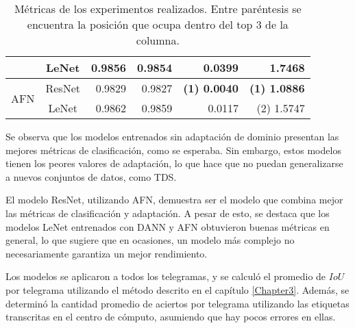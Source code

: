 \begin{table}[H]
\begin{tabular}{cc|rr|rr}
                                     & LeNet  & 0.9856                              & 0.9854                              & 0.0399                              & 1.7468                              \\\hline
        \multirow[c]{2}{*}{AFN}      & ResNet & 0.9829                              & 0.9827                              & \textbf{{\footnotesize (1)} 0.0040} & \textbf{{\footnotesize (1)} 1.0886} \\
                                     & LeNet  & 0.9862                              & 0.9859                              & 0.0117                              & {\footnotesize (2)} 1.5747          \\

        \bottomrule
    \end{tabular}
    \caption{Métricas de los experimentos realizados. Entre paréntesis se encuentra la posición que ocupa dentro del top 3 de la columna.}
    \label{tab:metricas-experimentos}
\end{table}

Se observa que los modelos entrenados sin adaptación de dominio presentan las mejores métricas de clasificación, como
se esperaba. Sin embargo, estos modelos tienen los peores valores de adaptación, lo que hace que no puedan
generalizarse a nuevos conjuntos de datos, como TDS.

El modelo ResNet, utilizando AFN, demuestra ser el modelo que combina mejor las métricas de clasificación y adaptación.
A pesar de esto, se destaca que los modelos LeNet entrenados con DANN y AFN obtuvieron buenas métricas en general, lo
que sugiere que en ocasiones, un modelo más complejo no necesariamente garantiza un mejor rendimiento.

Los modelos se aplicaron a todos los telegramas, y se calculó el promedio de $IoU$ por telegrama utilizando el método
descrito en el capítulo \ref{Chapter3}. Además, se determinó la cantidad promedio de aciertos por telegrama utilizando
las etiquetas transcritas en el centro de cómputo, asumiendo que hay pocos errores en ellas.

